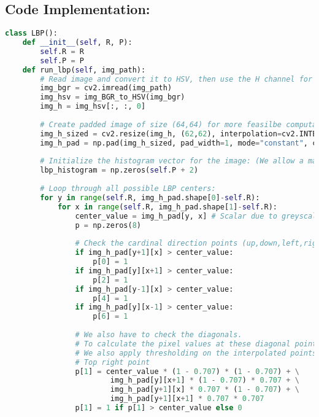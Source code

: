\documentclass{article}
\begin{document}
\subsection{Code Implementation:}
\begin{lstlisting}[language=Python]
class LBP():
    def __init__(self, R, P):
        self.R = R
        self.P = P
    def run_lbp(self, img_path):
        # Read image and convert it to HSV, then use the H channel for all downstream tasks.
        img_bgr = cv2.imread(img_path)
        img_hsv = img_BGR_to_HSV(img_bgr)
        img_h = img_hsv[:, :, 0]
        
        # Create padded image of size (64,64) for more feasilbe computation
        img_h_sized = cv2.resize(img_h, (62,62), interpolation=cv2.INTER_AREA)
        img_h_pad = np.pad(img_h_sized, pad_width=1, mode="constant", constant_values=0)
        
        # Initialize the histogram vector for the image: (We allow a max index of P + 1 0->9 in this case)
        lbp_histogram = np.zeros(self.P + 2)
        
        # Loop through all possible LBP centers:
        for y in range(self.R, img_h_pad.shape[0]-self.R):
            for x in range(self.R, img_h_pad.shape[1]-self.R):
                center_value = img_h_pad[y, x] # Scalar due to greyscale
                p = np.zeros(8)
                
                # Check the cardinal direction points (up,down,left,right)
                if img_h_pad[y+1][x] > center_value:
                    p[0] = 1
                if img_h_pad[y][x+1] > center_value:
                    p[2] = 1
                if img_h_pad[y-1][x] > center_value:
                    p[4] = 1
                if img_h_pad[y][x-1] > center_value:
                    p[6] = 1
                    
                # We also have to check the diagonals.
                # To calculate the pixel values at these diagonal points, we need to do pixel-interpolation
                # We also apply thresholding on the interpolated points compared to the center to determine 0/1.
                # Top right point
                p[1] = center_value * (1 - 0.707) * (1 - 0.707) + \
                        img_h_pad[y][x+1] * (1 - 0.707) * 0.707 + \
                        img_h_pad[y+1][x] * 0.707 * (1 - 0.707) + \
                        img_h_pad[y+1][x+1] * 0.707 * 0.707        
                p[1] = 1 if p[1] > center_value else 0
                

\end{lstlisting}
\end{document}
